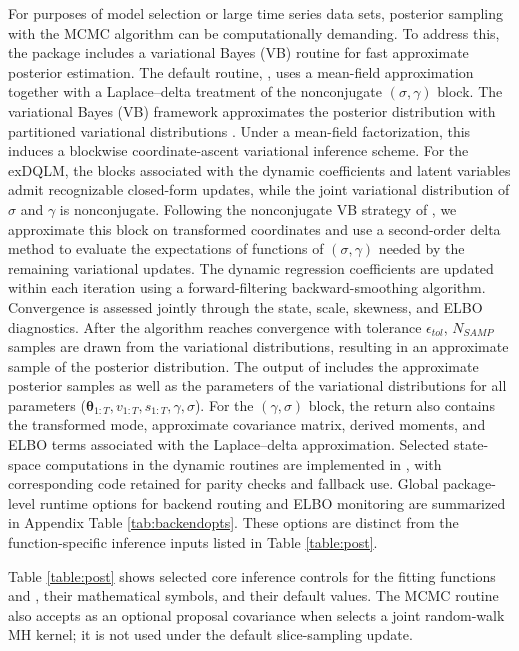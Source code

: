 \documentclass[jss]{jss}
\begin{document}
For purposes of model selection or large time series data sets, posterior sampling with the MCMC algorithm can be computationally demanding. To address this, the package includes a variational Bayes (VB) routine for fast approximate posterior estimation. The default routine, , uses a mean-field approximation together with a Laplace--delta treatment of the nonconjugate $(\sigma,\gamma)$ block. The variational Bayes (VB) framework approximates the posterior distribution with partitioned variational distributions \citep{ostwald2014tutorial,beal2003variational}. Under a mean-field factorization, this induces a blockwise coordinate-ascent variational inference scheme. For the exDQLM, the blocks associated with the dynamic coefficients and latent variables admit recognizable closed-form updates, while the joint variational distribution of $\sigma$ and $\gamma$ is nonconjugate. Following the nonconjugate VB strategy of \cite{wang2013nonconjugatevb}, we approximate this block on transformed coordinates and use a second-order delta method to evaluate the expectations of functions of $(\sigma,\gamma)$ needed by the remaining variational updates. The dynamic regression coefficients are updated within each iteration using a forward-filtering backward-smoothing algorithm. Convergence is assessed jointly through the state, scale, skewness, and ELBO diagnostics. After the algorithm reaches convergence with tolerance $\epsilon_{tol}$, $N_{SAMP}$ samples are drawn from the variational distributions, resulting in an approximate sample of the posterior distribution. The output of  includes the approximate posterior samples as well as the parameters of the variational distributions for all parameters ($\boldsymbol{\theta}_{1:T},v_{1:T},s_{1:T},\gamma,\sigma$). For the $(\gamma,\sigma)$ block, the return also contains the transformed mode, approximate covariance matrix, derived moments, and ELBO terms associated with the Laplace--delta approximation. Selected state-space computations in the dynamic routines are implemented in , with corresponding  code retained for parity checks and fallback use. Global package-level runtime options for backend routing and ELBO monitoring are summarized in Appendix Table \ref{tab:backendopts}. These options are distinct from the function-specific inference inputs listed in Table \ref{table:post}.

Table \ref{table:post} shows selected core inference controls for the fitting functions  and , their mathematical symbols, and their default values. The MCMC routine also accepts  as an optional proposal covariance when  selects a joint random-walk MH kernel; it is not used under the default slice-sampling update.
\end{document}
